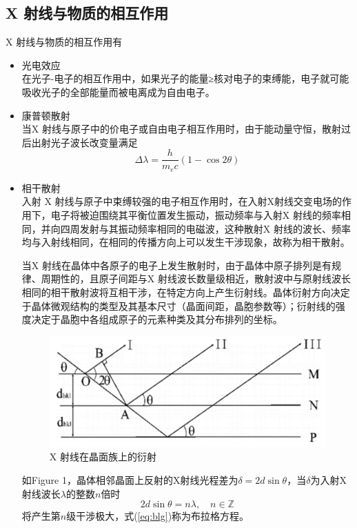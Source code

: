 \documentclass{whureport}
\begin{document}
\begin{multicols}{2}
	\subsection{X 射线与物质的相互作用}
	X 射线与物质的相互作用有
	\begin{itemize}
		\item 光电效应\\
		在光子-电子的相互作用中，如果光子的能量≥核对电子的束缚能，电子就可能吸收光子的全部能量而被电离成为自由电子。
		\item 康普顿散射\\
		当X 射线与原子中的价电子或自由电子相互作用时，由于能动量守恒，散射过后出射光子波长改变量满足
		\begin{equation}
			\Delta\lambda=\dfrac{h}{m_ec}(1-\cos2\theta)
		\end{equation}
		\item 相干散射\\
		入射 X 射线与原子中束缚较强的电子相互作用时，在入射X射线交变电场的作用下，电子将被迫围绕其平衡位置发生振动，振动频率与入射X 射线的频率相同，并向四周发射与其振动频率相同的电磁波，这种散射X 射线的波长、频率均与入射线相同，在相同的传播方向上可以发生干涉现象，故称为相干散射。
		
		当X 射线在晶体中各原子的电子上发生散射时，由于晶体中原子排列是有规律、周期性的，且原子间距与X 射线波长数量级相近，散射波中与原射线波长相同的相干散射波将互相干涉，在特定方向上产生衍射线。晶体衍射方向决定于晶体微观结构的类型及其基本尺寸（晶面间距，晶胞参数等）；衍射线的强度决定于晶胞中各组成原子的元素种类及其分布排列的坐标。
		\begin{figure}[H]
			\centering
			\includegraphics[scale=0.4]{1.jpg}
			\captionsetup{font=footnotesize}
			\caption{X 射线在晶面族上的衍射}
		\end{figure}
		如Figure 1，晶体相邻晶面上反射的X射线光程差为$\delta=2d\sin\theta$，当$\delta$为入射X射线波长$\lambda$的整数$n$倍时
		\begin{equation}\label{eq:blg}
			2d\sin\theta=n\lambda,\quad n\in\mathbb{Z}
		\end{equation}
		将产生第$n$级干涉极大，式(\ref{eq:blg})称为布拉格方程。
	\end{itemize}

\end{multicols}
\end{document}
